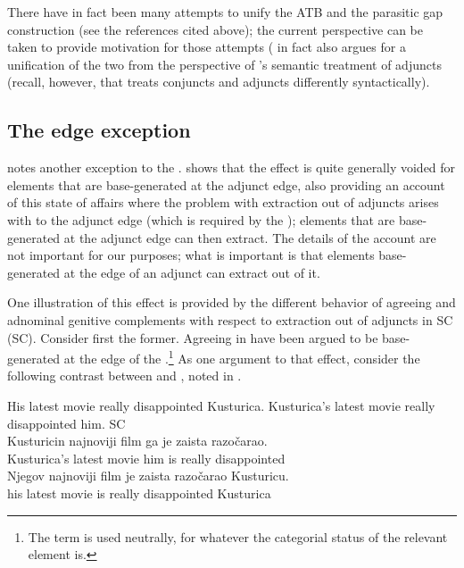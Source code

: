 \documentclass[output=paper]{langsci/langscibook}
\begin{document}
There have in fact been many attempts to unify the
\gls{ATB} and the parasitic
gap construction (see the references cited above); the current perspective can
be taken to provide motivation for those attempts (\citealt{Takahashi1994} in
fact also argues for a unification of the two from the perspective of
\citeauthor{Higginbotham1985}’s semantic treatment of adjuncts
(recall, however, that \citeauthor{Takahashi1994} treats conjuncts and adjuncts
differently syntactically).

\subsection{The edge exception}

\textcite{Boskovic2018} notes another exception to the
.  \textcite{Boskovic2018} shows that
the  effect is quite generally voided
for elements that are base-generated at the adjunct edge, also providing an
account of this state of affairs where the problem with extraction out of
adjuncts arises with  to the adjunct edge (which is required by
the ); elements that are base-generated at the adjunct edge
can then extract.  The details of the account are not important for our
purposes; what is important is that elements base-generated at the edge of an
adjunct can extract out of it.

One illustration of this effect is provided by the different behavior of
agreeing  and adnominal genitive complements
with respect to extraction out of adjuncts in \glsdesc{SC}
(\gls{SC}).  Consider first the former.  Agreeing  in
 have been argued to be base-generated at the edge of the
.\footnote{The term  is used neutrally, for
whatever the categorial status of the relevant element is.} As one argument to
that effect, consider the following  contrast between
 and , noted in \textcite{Despic2011,Despic2013}.

\ea\label{ex:key:35.17}
	\ea His latest movie really disappointed Kusturica.
	\ex Kusturica’s latest movie really disappointed him.
    \ex\label{ex-26:key:17c} \glsdesc{SC} \parencites[31]{Despic2011}[245]{Despic2013}\\
        \gll    \llap{*}Kusturicin najnoviji  film ga je zaista razočarao.\\
                Kusturica’s  latest  movie  him  is  really  disappointed\\
	\ex
        \gll    \llap{*}Njegov najnoviji film je zaista razočarao Kusturicu.\\
                his latest movie is really disappointed Kusturica\\
	\z
\z
\end{document}
